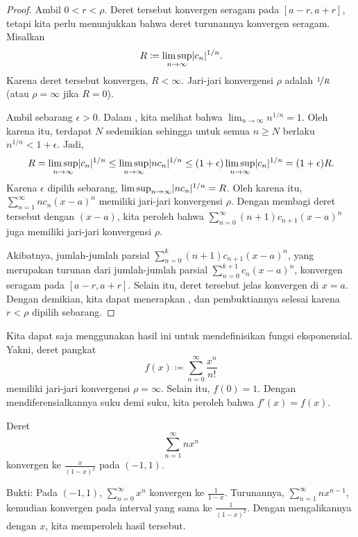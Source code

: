 \begin{proof}
Ambil $0 < r < \rho$.
Deret tersebut konvergen seragam pada
$[a-r,a+r]$,
tetapi kita perlu menunjukkan bahwa deret turunannya konvergen seragam.
Misalkan
\begin{equation*}
R \coloneqq \limsup_{n \to \infty} \lvert {c_n} \rvert^{1/n} .
\end{equation*}
Karena deret tersebut konvergen, $R < \infty$.
Jari-jari konvergensi $\rho$ adalah $\nicefrac{1}{R}$ (atau $\rho = \infty$ jika $R=0$).

Ambil sebarang $\epsilon > 0$.  Dalam ,
kita melihat bahwa $\lim_{n\to\infty} n^{1/n} = 1$.
Oleh karena itu, terdapat $N$ sedemikian sehingga untuk semua $n \geq N$ berlaku
$n^{1/n} < 1+\epsilon$.
Jadi,
\begin{equation*}
R = 
\limsup_{n \to \infty}
\lvert {c_n} \rvert^{1/n}
\leq
\limsup_{n \to \infty}
\lvert {n c_n} \rvert^{1/n}
\leq
(1+\epsilon)
\limsup_{n \to \infty}
\lvert {c_n} \rvert^{1/n}
=
(1+\epsilon)R .
\end{equation*}
Karena $\epsilon$ dipilih sebarang, $\limsup_{n \to \infty} \lvert {n c_n} \rvert^{1/n} = R$.
Oleh karena itu, $\sum_{n=1}^\infty n c_{n} {(x-a)}^{n}$ memiliki jari-jari
konvergensi $\rho$.  Dengan membagi deret tersebut dengan $(x-a)$, kita peroleh bahwa
$\sum_{n=0}^\infty (n+1) c_{n+1} {(x-a)}^{n}$ juga memiliki jari-jari konvergensi
$\rho$.

Akibatnya, jumlah-jumlah parsial
$\sum_{n=0}^k (n+1) c_{n+1} {(x-a)}^{n}$,
yang merupakan turunan dari jumlah-jumlah parsial
$\sum_{n=0}^{k+1} c_{n} {(x-a)}^{n}$,
konvergen seragam pada $[a-r,a+r]$.  Selain itu,
deret tersebut jelas konvergen di $x=a$.
Dengan demikian, kita dapat menerapkan , dan
pembuktiannya selesai karena $r < \rho$ dipilih sebarang.
\end{proof}

\begin{example} \label{example:exponentialbypowerseries}
Kita dapat saja menggunakan hasil ini untuk mendefinisikan fungsi eksponensial.  Yakni,
deret pangkat
\begin{equation*}
f(x) \coloneqq \sum_{n=0}^\infty \frac{x^n}{n!}
\end{equation*}
memiliki jari-jari konvergensi $\rho=\infty$.  Selain itu,
$f(0) = 1$.
Dengan mendiferensialkannya
suku demi suku, kita peroleh bahwa $f'(x) = f(x)$.
\end{example}

\begin{example}
Deret
\begin{equation*}
\sum_{n=1}^\infty n x^n
\end{equation*}
konvergen ke $\frac{x}{{(1-x)}^2}$ pada $(-1,1)$.

Bukti:
Pada $(-1,1)$, $\sum_{n=0}^\infty x^n$ konvergen ke
$\frac{1}{1-x}$.  Turunannya, $\sum_{n=1}^\infty n x^{n-1}$, kemudian konvergen
pada interval yang sama ke $\frac{1}{{(1-x)}^2}$.  Dengan mengalikannya dengan $x$,
kita memperoleh hasil tersebut.
\end{example}

